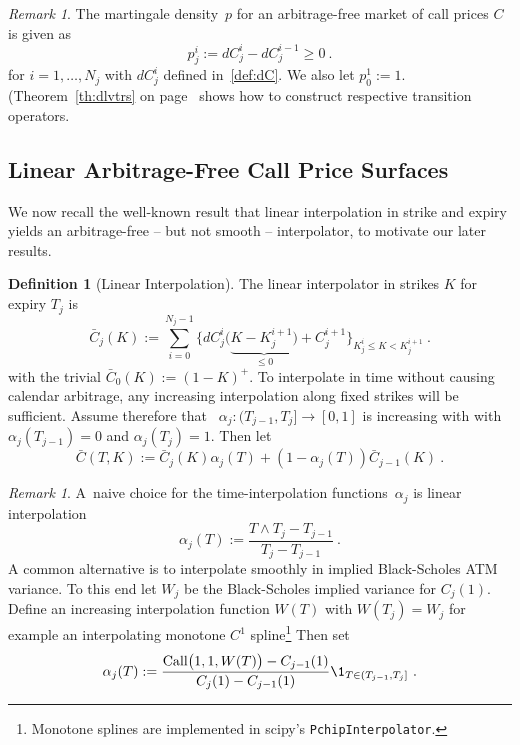 \documentclass[twoside]{article}
\theoremstyle{plain}
\theoremstyle{definition}
\newtheorem{definition}[theorem]{Definition}
\theoremstyle{remark}
\newtheorem{remark}[theorem]{Remark}
\begin{document}
\begin{remark}
    The martingale density~$p$ for an arbitrage-free market of call prices $C$ is given as
    \begin{equation}\label{def:p}
        p_j^i := dC_j^i - dC_j^{i-1} \geq 0 \ .
    \end{equation}
    for $i=1,\ldots,N_j$
    with $dC^i_j$ defined in~\eqref{def:dC}. We also let $p_0^1:=1$. (Theorem~\ref{th:dlvtrs} on page~\pageref{th:dlvtrs} shows how to construct respective transition operators.   
\end{remark}


\subsection{Linear Arbitrage-Free Call Price Surfaces}\label{sec:lin_surface}

We now recall the well-known result that linear interpolation in strike and expiry yields an arbitrage-free -- but not smooth -- interpolator, to motivate our later results.

\begin{definition}[Linear Interpolation]\label{th:linintp}
The linear interpolator in strikes $K$ for expiry $T_j$ is
$$
    \bar C_j(K) := \sum_{i=0}^{N_j-1} \Big\{  dC^i_j ( \underbrace{ K-K_j^{i+1}) }_{\leq 0} + C^{i+1}_j \Big\}_{K_j^i\leq K<K_j^{i+1}} \ .
$$
with the trivial $\bar C_0(K):=(1-K)^+$. To interpolate in time without causing
calendar arbitrage,
any increasing interpolation along fixed strikes will be sufficient. Assume 
therefore that ~$\alpha_j:(T_{j-1},T_j]\rightarrow [0,1]$ 
is increasing with
with $\alpha_j(T_{j-1})=0$ and $\alpha_j(T_j)=1$. Then let
\begin{equation}\label{eq:intT}
    \bar C(T,K) := \bar C_j(K) \alpha_j(T) + (1-\alpha_j(T) ) \bar C_{j-1}(K) \ .
\end{equation}
\end{definition}   

 \begin{remark}
    A~naive choice for the time-interpolation functions~$\alpha_j$ is
    linear interpolation
    \begin{equation}\label{eq:linintp}
         \alpha_j(T):= \frac{ T\wedge T_j - T_{j-1} }{ T_j - T_{j-1} } \ .
    \end{equation}
    A common alternative is to interpolate smoothly in implied Black-Scholes ATM variance.
    To this end let $W_j$ be the Black-Scholes implied variance for $C_j(1)$. 
    Define an increasing interpolation function $W(T)$ with $W(T_j)=W_j$
    for example an interpolating monotone $C^1$ spline\footnote{Monotone splines are implemented in 
    scipy's \texttt{PchipInterpolator}.} Then set
    $$
    \alpha_j(T) := \frac{ \mathrm{Call}\big(1, 1, W(T)\big) - C_{j-1}(1) }
    { C_j(1) - C_{j-1}(1) } \1_{T\in(T_{j-1},T_j]} \ .
    $$
    
\end{remark}
\end{document}
